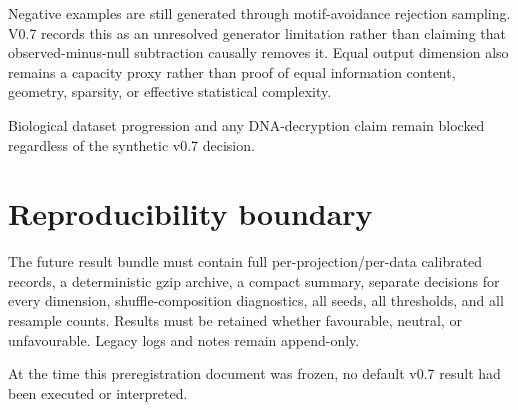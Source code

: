\documentclass[11pt]{article}
\begin{document}
Negative examples are still generated through motif-avoidance rejection sampling. V0.7 records this as an unresolved generator limitation rather than claiming that observed-minus-null subtraction causally removes it. Equal output dimension also remains a capacity proxy rather than proof of equal information content, geometry, sparsity, or effective statistical complexity.

Biological dataset progression and any DNA-decryption claim remain blocked regardless of the synthetic v0.7 decision.

\section{Reproducibility boundary}
The future result bundle must contain full per-projection/per-data calibrated records, a deterministic gzip archive, a compact summary, separate decisions for every dimension, shuffle-composition diagnostics, all seeds, all thresholds, and all resample counts. Results must be retained whether favourable, neutral, or unfavourable. Legacy logs and notes remain append-only.

At the time this preregistration document was frozen, no default v0.7 result had been executed or interpreted.
\end{document}
